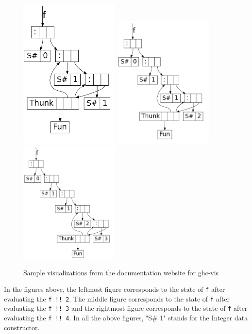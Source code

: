 \documentclass[format=acmlarge, review=false, nonacm=false, screen=true]{acmart}
\begin{document}
\begin{figure}[H]
\includegraphics[width = 5cm]{fib2}
\includegraphics[width = 5cm]{fib3}
\includegraphics[width = 5cm]{fib4}
\caption{Sample visualizations from the documentation website for ghc-vis\cite{ghc-vis}}
\end{figure}

In the figures above, the leftmost figure corresponds to the state of \texttt{f} after evaluating the \texttt{f !! 2}. The middle figure corresponds to the state of \texttt{f} after evaluating the \texttt{f !! 3} and the rightmost figure corresponds to the state of \texttt{f} after evaluating the \texttt{f !! 4}. In all the above figures, "S\# 1" stands for the Integer data constructor. 
\end{document}
